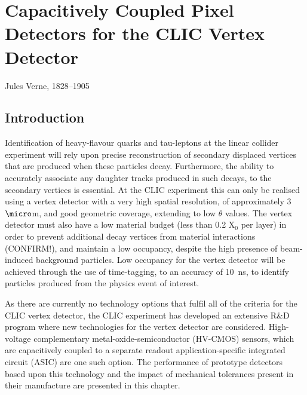 \chapter{Capacitively Coupled Pixel Detectors for the CLIC Vertex Detector}
\label{chap:clicvertex}

{Jules Verne, 1828--1905}


\section{Introduction}

Identification of heavy-flavour quarks and tau-leptons at the linear collider experiment will rely upon precise reconstruction of secondary displaced vertices that are produced when these particles decay.  Furthermore, the ability to accurately associate any daughter tracks produced in such decays, to the secondary vertices is essential.  At the CLIC experiment this can only be realised using a vertex detector with a very high spatial resolution, of approximately 3~${\micro}$m, and good geometric coverage, extending to low $\theta$ values.  The vertex detector must also have a low material budget (less than 0.2 $\text{X}_{0}$ per layer) in order to prevent additional decay vertices from material interactions (CONFIRM!), and maintain a low occupancy, despite the high presence of beam-induced background particles.  Low occupancy for the vertex detector will be achieved through the use of time-tagging, to an accuracy of 10~ns, to identify particles produced from the physics event of interest.  

As there are currently no technology options that fulfil all of the criteria for the CLIC vertex detector, the CLIC experiment has developed an extensive R\&D program where new technologies for the vertex detector are considered.  High-voltage complementary metal-oxide-semiconductor (HV-CMOS) sensors, which are capacitively coupled to a separate readout application-specific integrated circuit (ASIC) are one such option. The performance of prototype detectors based upon this technology and the impact of mechanical tolerances present in their manufacture are presented in this chapter.  


